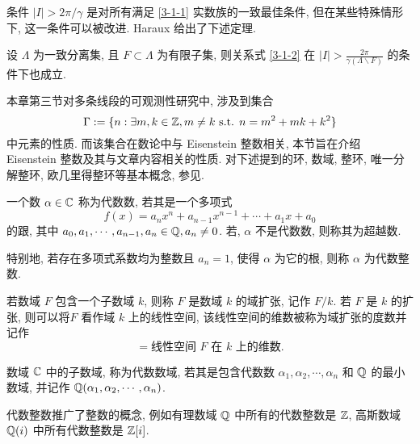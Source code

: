     条件 $|I|> 2\pi /\gamma$ 是对所有满足 \eqref{3-1-1} 实数族的一致最佳条件, 但在某些特殊情形下, 这一条件可以被改进. Haraux \cite{Haraux1989} 给出了下述定理.
    
    \begin{theorem}\label{thm-haraux}
    设 $\Lambda$ 为一致分离集, 且 $F\subset \Lambda$ 为有限子集, 则关系式 \eqref{3-1-2} 在 $|I|> \frac{2\pi}{\gamma(\Lambda \backslash F)}$ 的条件下也成立.
    \end{theorem}
    

    
   
    本章第三节对多条线段的可观测性研究中, 涉及到集合
    \begin{equation}\label{Gamma-set}
        \Gamma:=\lbrace n:\exists m,k\in \mathbb{Z},m\neq k \text{ s.t. } n=m^2+mk+k^2 \rbrace
    \end{equation}
    中元素的性质. 而该集合在数论中与 Eisenstein 整数相关, 本节旨在介绍 Eisenstein 整数及其与文章内容相关的性质. 对下述提到的环, 数域, 整环, 唯一分解整环, 欧几里得整环等基本概念, 参见. 
    
\begin{definition}
    一个数 $\alpha \in \mathbb{C}$  称为代数数, 若其是一个多项式
    \begin{equation*}
        f(x)=a_nx^n+a_{n-1}x^{n-1}+\cdots+a_1x+a_0
    \end{equation*}
    的跟, 其中 $a_0,a_1,\cdots,a_{n-1},a_n\in \mathbb{Q}, a_n\neq 0$. 
    若, $\alpha$ 不是代数数, 则称其为超越数.
    
    特别地, 若存在多项式系数均为整数且 $a_n=1$, 使得 $\alpha$ 为它的根, 则称 $\alpha$ 为代数整数. 
\end{definition}

\begin{definition}
    若数域 $F$ 包含一个子数域 $k$, 则称 $F$ 是数域 $k$ 的域扩张, 记作 $F /k$. 若 $F$ 是 $k$ 的扩张, 则可以将$F$ 看作域 $k$ 上的线性空间, 该线性空间的维数被称为域扩张的度数并记作
    \begin{equation*}
        [F:k]=\text{线性空间 } F \text{ 在 } k \text{ 上的维数}.
    \end{equation*}
\end{definition}

\begin{definition}
    数域 $\mathbb{C}$ 中的子数域, 称为代数数域, 若其是包含代数数 $\alpha_1,\alpha_2,\cdots,\alpha_n$ 和 $\mathbb{Q}$ 的最小数域, 并记作 $\mathbb{Q}(\alpha_1,\alpha_2,\cdots,\alpha_n)$.
\end{definition}

代数整数推广了整数的概念, 例如有理数域 $\mathbb{Q}$ 中所有的代数整数是 $\mathbb{Z}$, 高斯数域 $\mathbb{Q}(i)$ 中所有代数整数是 $\mathbb{Z}[i]$.

